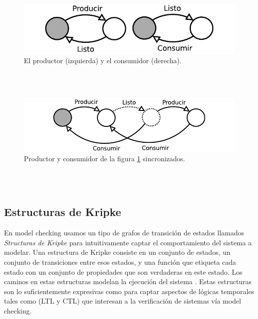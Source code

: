 \documentclass[titlepage, 12pt]{book}
\begin{document}
\begin{figure}[htp] %
  \centering
    \includegraphics{Imagenes/prodYcons.pdf}
  \caption{El productor (izquierda) y el consumidor (derecha).}
  \label{figura1}
\end{figure}
~\\\\

\begin{figure}[htp] %
  \centering
    \includegraphics{Imagenes/prodYconsSincro.pdf}
  \caption{Productor y consumidor de la figura \ref{figura1} sincronizados.}
  \label{figura2}
\end{figure}
~\\\\

\subsection*{Estructuras de Kripke}
En model checking usamos un tipo de grafos de transici\'on de estados llamados \textit{Structuras de Kripke} para intuitivamente captar el comportamiento del sistema a modelar. Una estructura de Kripke consiste en un conjunto de estados, un conjunto de transiciones entre esos estados, y una funci\'on que etiqueta cada estado con un conjunto de propiedades que son verdaderas en este estado. Los caminos en estas estructuras modelan la ejecuci\'on del sistema \cite{Clarke}. Estas estructuras son lo suficientemente expresivas como para captar aspectos de l\'ogicas temporales tales como (LTL y CTL) que interesan a la verificaci\'on de sistemas v\'ia model checking.\\
\end{document}
